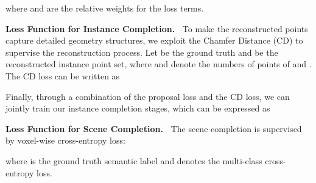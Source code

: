 \documentclass[final]{cvpr}
\begin{document}
where  and  are the relative weights for the loss terms.

\noindent \textbf{Loss Function for Instance Completion.~}
To make the reconstructed points capture detailed geometry structures, we exploit the Chamfer Distance (CD) to supervise the reconstruction process. 
Let  be the ground truth and  be the reconstructed instance point set, where  and  denote the numbers of points of  and . The CD loss can be written as

Finally, through a combination of the proposal loss and the CD loss, we can jointly train our instance completion stages, which can be expressed as


\noindent \textbf{Loss Function for Scene Completion.~}
The scene completion is supervised by  voxel-wise cross-entropy loss:

where  is the ground truth semantic label and  denotes the multi-class cross-entropy loss.
\end{document}
